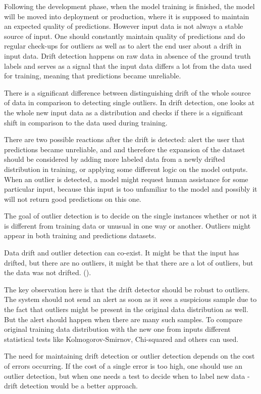 Following the development phase, when the model training is finished, the model will be moved into deployment or production, where it is supposed to maintain an expected quality of predictions. However input data is not always a stable source of input. One should constantly maintain quality of predictions and do regular check-ups for outliers as well as to alert the end user about a drift in input data. Drift detection happens on raw data in absence of the ground truth labels and serves as a signal that the input data differs a lot from the data used for training, meaning that predictions became unreliable.

There is a significant difference between distinguishing drift of the whole source of data in comparison to detecting single outliers. In drift detection, one looks at the whole new input data as a distribution and checks if there is a significant shift in comparison to the data used during training.

There are two possible reactions after the drift is detected: alert the user that predictions became unreliable, and and therefore the expansion of the dataset should be considered by adding more labeled data from a newly drifted distribution in training, or applying some different logic on the model outputs. When an outlier is detected, a model might request human assistance for some particular input, because this input is too unfamiliar to the model and possibly it will not return good predictions on this one.

The goal of outlier detection is to decide on the single instances whether or not it is different from training data or unusual in one way or another. Outliers might appear in both training and predictions datasets.

Data drift and outlier detection can co-exist. It might be that the input has drifted, but there are no outliers, it might be that there are a lot of outliers, but the data was not drifted. (\cite{samuylova_2021}).

The key observation here is that the drift detector should be robust to outliers. The system should not send an alert as soon as it sees a suspicious sample due to the fact that outliers might be present in the original data distribution as well. But the alert should happen when there are many such samples. To compare original training data distribution with the new one from inputs different statistical tests like Kolmogorov-Smirnov, Chi-squared and others can used.

The need for maintaining drift detection or outlier detection depends on the cost of errors occurring. If the cost of a single error is too high, one should use an outlier detection, but when one needs a test to decide when to label new data - drift detection would be a better approach.

